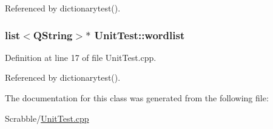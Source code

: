 Referenced by dictionarytest().

\hypertarget{class_unit_test_aeb6acd51a206123112b000f6520ac25b}{
\subsubsection[{wordlist}]{\setlength{\rightskip}{0pt plus 5cm}list$<$Q\-String$>$$\ast$ Unit\-Test\-::wordlist\hspace{0.3cm}{\ttfamily [private]}}}\label{class_unit_test_aeb6acd51a206123112b000f6520ac25b}


Definition at line 17 of file Unit\-Test.\-cpp.



Referenced by dictionarytest().



The documentation for this class was generated from the following file\-:\begin{DoxyCompactItemize}
\item 
Scrabble/\hyperlink{_unit_test_8cpp}{Unit\-Test.\-cpp}\end{DoxyCompactItemize}
